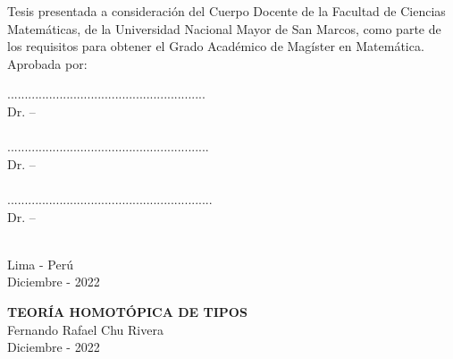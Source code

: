 \documentclass[12pt]{report}
\theoremstyle{definition}
\theoremstyle{plain}
\newenvironment{dedication}
  {\clearpage           %
   \thispagestyle{empty}%
   \vspace*{\stretch{1}}%
   \itshape             %
   \raggedleft          %
  }
  {\par %
   \vspace{\stretch{3}} %
   \clearpage           %
  }
\begin{document}
Tesis presentada a consideraci\'on del Cuerpo Docente de la Facultad de Ciencias Matem\'aticas, de la Universidad Nacional Mayor de San Marcos, como parte de los requisitos para obtener el Grado Acad\'emico de Mag\'ister en Matem\'atica.\\

Aprobada por:\\
\vspace{2cm}

\begin{center}
    .........................................................\\
    Dr. -- \\
    \quad    \\[1.5cm]
    ..........................................................\\
    Dr. -- \\
    \quad  \\[1.5cm]
    ...........................................................\\
    Dr. -- \\
    \quad  \\[1.5cm]
\end{center}

\vfill
\begin{center}
    Lima - Per\'u \\ Diciembre - 2022
\end{center}



\newpage
{}
\begin{center}
    \textbf{TEOR\'IA HOMOT\'OPICA DE TIPOS} \\[0.4cm]
    Fernando Rafael Chu Rivera \\[0.4cm]
    Diciembre - 2022 \\[0.7cm]
\end{center}
\end{document}
